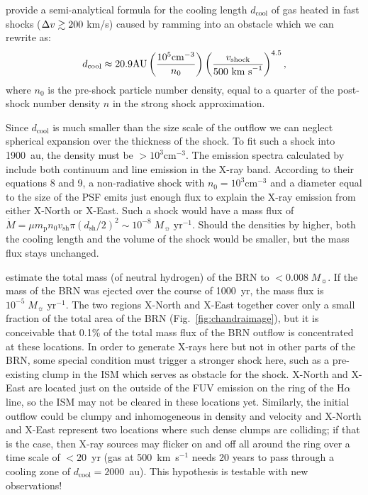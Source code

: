 \documentclass[]{aastex631}
\begin{document}
\citet{2002ApJ...576L.149R} provide a
semi-analytical formula for the cooling length
$d_{\mathrm{cool}}$ of gas
heated in fast shocks ($\Delta v \gtrsim 200$ km/s) caused by ramming into an obstacle
which we can rewrite as:
\begin{equation}
d_{\mathrm{cool}} \approx 20.9 \mathrm{ AU}
    \left(\frac{10^5\mathrm{ cm}^{-3}}{n_0}\right)
    \left(\frac{v_{\mathrm{shock}}}{500\textnormal{ km s}^{-1}}\right)^{4.5},
\label{raga}
\end{equation}
where $n_0$ is the pre-shock particle number density, equal to a
quarter of the post-shock number density $n$ in the strong shock
approximation.

Since $d_{\mathrm{cool}}$ is much smaller than the size scale of the outflow we can neglect spherical expansion over the thickness of the shock.
To fit such a shock into 1900~au, the density must be $>10^3\mathrm{ cm}^{-3}$. The emission spectra calculated by \citet{2002ApJ...576L.149R} include both continuum and line emission in the X-ray band. According to their equations 8 and 9, a non-radiative shock with $n_0=10^3\mathrm{ cm}^{-3}$ and a diameter equal to the size of the PSF emits just enough flux to explain the X-ray emission from either X-North or X-East. Such a shock would have a mass flux of $\dot M = \mu m_\mathrm{p} n_0 v_\mathrm{sh} \pi (d_\mathrm{sh}/2)^2 \sim 10^{-8}\;M_\sun\;\mathrm{yr}^{-1}$.
Should the densities by higher, both the cooling length and the volume of the shock would be smaller, but the mass flux stays unchanged.

\citet{2020Natur.587..387H} estimate the total mass (of neutral hydrogen) of the BRN to $<0.008\;M_\sun{}$. If the mass of the BRN was ejected over the course of 1000~yr, the mass flux is $10^{-5}\;M_\sun\;\mathrm{yr}^{-1}$. The two regions X-North and X-East together cover only a small fraction of the total area of the BRN (Fig.~\ref{fig:chandraimage}), but it is conceivable that 0.1\% of the total mass flux of the BRN outflow is concentrated at these locations. In order to generate X-rays here but not in other parts of the BRN, some special condition must trigger a stronger shock here, such as a pre-existing clump in the ISM which serves as obstacle for the shock. X-North and X-East are located just on the outside of the FUV emission on the ring of the H$\alpha$ line, so the ISM may not be cleared in these locations yet. Similarly, the initial outflow could be clumpy and inhomogeneous in density and velocity and X-North and X-East represent two locations where such dense clumps are colliding; if that is the case, then X-ray sources may flicker on and off all around the ring over a time scale of $<20$~yr (gas at 500~km~s$^{-1}$ needs 20 years to pass through a cooling zone of $d_{\mathrm{cool}}=2000$~au). This hypothesis is testable with new observations!
\end{document}
